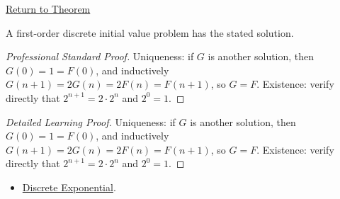 \newpage
{}
\label{prf:discrete-ivp}

\begin{remark*}[Return]
\hyperref[prop:discrete-ivp]{Return to Theorem}
\end{remark*}

\begin{proposition*}
A first-order discrete initial value problem has the stated solution.
\end{proposition*}

\begin{proof}[Professional Standard Proof]
\LRAProofBodyStart
Uniqueness: if \(G\) is another solution, then \(G(0) = 1 = F(0)\), and
inductively \(G(n+1) = 2G(n) = 2F(n) = F(n+1)\), so \(G = F\).
Existence: verify directly that \(2^{n+1} = 2\cdot 2^n\) and \(2^0 = 1\).
\end{proof}

\begin{proof}[Detailed Learning Proof]
\LRAProofBodyStart
Uniqueness: if \(G\) is another solution, then \(G(0) = 1 = F(0)\), and
inductively \(G(n+1) = 2G(n) = 2F(n) = F(n+1)\), so \(G = F\).
Existence: verify directly that \(2^{n+1} = 2\cdot 2^n\) and \(2^0 = 1\).
\end{proof}

\begin{remark*}
\end{remark*}

\begin{dependencies}
\begin{itemize}
  \item \hyperref[def:discrete-exponential]{Discrete Exponential}.
\end{itemize}
\end{dependencies}
\clearpage

